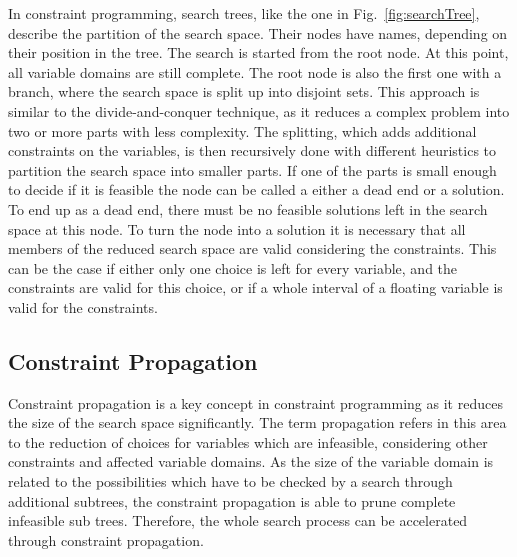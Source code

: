 \documentclass[10pt,
               a4paper,
               journal,
               ]{IEEEtran}
\newcommand{\reffig}[1]{{Fig.~\ref{#1}}}
\begin{document}
	In constraint programming, search trees, like the one in \reffig{fig:searchTree}, describe the partition of the search space. Their nodes have names, depending on their position in the tree. The search is started from the root node. At this point, all variable domains are still complete. The root node is also the first one with a branch, where the search space is split up into disjoint sets. This approach is similar to the divide-and-conquer technique, as it reduces a complex problem into two or more parts with less complexity. The splitting, which adds additional constraints on the variables, is then recursively done with different heuristics to partition the search space into smaller parts. If one of the parts is small enough to decide if it is feasible the node can be called a either a dead end or a solution. To end up as a dead end, there must be no feasible solutions left in the search space at this node. To turn the node into a solution it is necessary that all members of the reduced search space are valid considering the constraints. This can be the case if either only one choice is left for every variable, and the constraints are valid for this choice, or if a whole interval of a floating variable is valid for the constraints.
	
	\subsection{Constraint Propagation}
	Constraint propagation is a key concept in constraint programming as it reduces the size of the search space significantly. The term propagation refers in this area to the reduction of choices for variables which are infeasible, considering other constraints and affected variable domains. As the size of the variable domain is related to the possibilities which have to be checked by a search through additional subtrees, the constraint propagation is able to prune complete infeasible sub trees. Therefore, the whole search process can be accelerated through constraint propagation.
	
\end{document}
